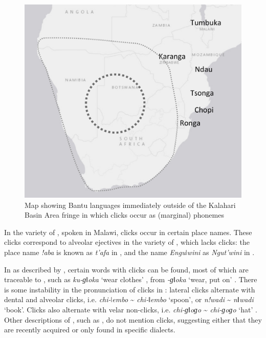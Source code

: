 \documentclass[output=paper
,newtxmath
,modfonts
,nonflat]{langsci/langscibook}
\begin{document}
\begin{figure}
\includegraphics[width=\textwidth]{figures/sands-fig4.png}
\caption{Map showing Bantu languages immediately outside of the Kalahari Basin Area fringe in which clicks occur as (marginal) phonemes}
\label{fig:sands:4}
\end{figure}

In the  variety of , spoken in Malawi, clicks occur in certain place names. These clicks correspond to alveolar ejectives in the  variety of , which lacks clicks: the  place name \textit{!aba} is known as \textit{t’afa} in , and the  name \textit{Enguǀwini} as \textit{Ngut’wini} in  \citep{Moyo1995}. 

In  as described by \citet{Borland1970}, certain words with clicks can be found, most of which are traceable to , such as \textit{ku-ɡǁoka} ‘wear clothes’ \citep[32]{Borland1970}, from  \textit{-ɡǁoka} ‘wear, put on’ \citep[85]{Doke1958}. There is some instability in the pronunciation of clicks in : lateral clicks alternate with dental and alveolar clicks, i.e. \textit{chi-ǀembo} {\textasciitilde} \textit{chi-ǁembo} ‘spoon’, or \textit{n!wadi} {\textasciitilde} \textit{nǁwadi} ‘book’. Clicks also alternate with velar non-clicks, i.e. \textit{chi-ɡǁoɡo} {\textasciitilde} \textit{chi-ɡoɡo} ‘hat’ \citep[30]{Borland1970}. Other descriptions of , such as \citet{Doke1931}, do not mention clicks, suggesting either that they are recently acquired or only found in specific dialects. 
\end{document}
